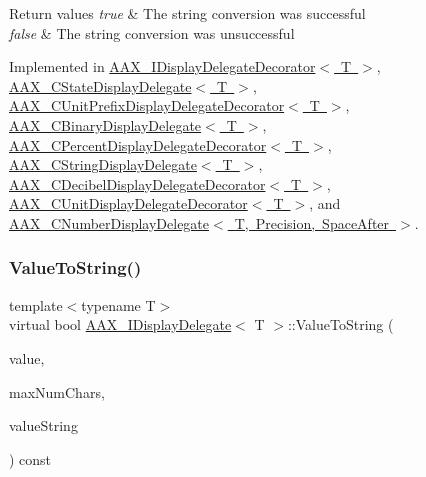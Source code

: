 \begin{DoxyRetVals}{Return values}
{\em true} & The string conversion was successful \\
\hline
{\em false} & The string conversion was unsuccessful \\
\hline
\end{DoxyRetVals}


Implemented in \mbox{\hyperlink{a01805_ada5780cfa332ac7946bf95aa65ae96f5}{A\+A\+X\+\_\+\+I\+Display\+Delegate\+Decorator$<$ T $>$}}, \mbox{\hyperlink{a01561_aa8c3a9028d0fcf4bb2a95390de8049fa}{A\+A\+X\+\_\+\+C\+State\+Display\+Delegate$<$ T $>$}}, \mbox{\hyperlink{a01589_a74d63ddd342455674e9b1b00dc0f76e2}{A\+A\+X\+\_\+\+C\+Unit\+Prefix\+Display\+Delegate\+Decorator$<$ T $>$}}, \mbox{\hyperlink{a01449_a37fc0647f758a9ff0d47595ba110ecdd}{A\+A\+X\+\_\+\+C\+Binary\+Display\+Delegate$<$ T $>$}}, \mbox{\hyperlink{a01549_a06407f0b1287891bf658bc4e4166e2e4}{A\+A\+X\+\_\+\+C\+Percent\+Display\+Delegate\+Decorator$<$ T $>$}}, \mbox{\hyperlink{a01581_a96ae6bc68f2a2df5224539b4b07f914b}{A\+A\+X\+\_\+\+C\+String\+Display\+Delegate$<$ T $>$}}, \mbox{\hyperlink{a01469_a147cb1d0b62b0a62c6e3bb98daf80027}{A\+A\+X\+\_\+\+C\+Decibel\+Display\+Delegate\+Decorator$<$ T $>$}}, \mbox{\hyperlink{a01585_a8531395e74327b93e210fd0aafaed3f7}{A\+A\+X\+\_\+\+C\+Unit\+Display\+Delegate\+Decorator$<$ T $>$}}, and \mbox{\hyperlink{a01509_a260439b47a0890a008f7984958e11662}{A\+A\+X\+\_\+\+C\+Number\+Display\+Delegate$<$ T, Precision, Space\+After $>$}}.

\mbox{\label{a01801_a471c7381db773683b69216a9c3f5eda7}} 
\subsubsection{\texorpdfstring{ValueToString()}{ValueToString()}\hspace{0.1cm}{\footnotesize\ttfamily [2/2]}}
{\footnotesize\ttfamily template$<$typename T$>$ \\
virtual bool \mbox{\hyperlink{a01801}{A\+A\+X\+\_\+\+I\+Display\+Delegate}}$<$ T $>$\+::Value\+To\+String (\begin{DoxyParamCaption}\item[{T}]{value,  }\item[{int32\+\_\+t}]{max\+Num\+Chars,  }\item[{\mbox{\hyperlink{a01573}{A\+A\+X\+\_\+\+C\+String}} $\ast$}]{value\+String }\end{DoxyParamCaption}) const\hspace{0.3cm}{\ttfamily [pure virtual]}}



